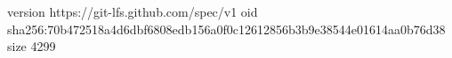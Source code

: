 version https://git-lfs.github.com/spec/v1
oid sha256:70b472518a4d6dbf6808edb156a0f0c12612856b3b9e38544e01614aa0b76d38
size 4299
